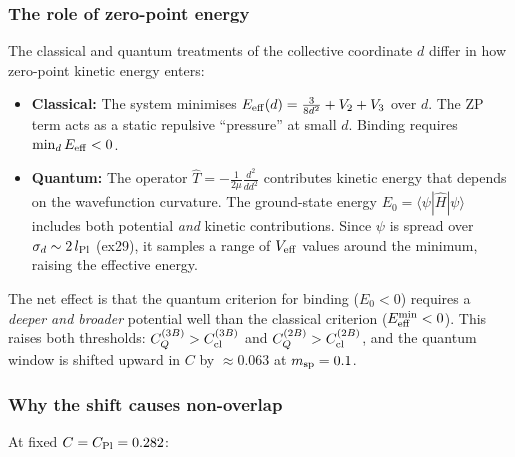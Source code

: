 \subsubsection{The role of zero-point energy}

The classical and quantum treatments of the collective coordinate $d$ differ
in how zero-point kinetic energy enters:

\begin{itemize}
\item \textbf{Classical:} The system minimises $E_{\rm eff}(d)=\frac{3}{8d^2}
  +V_2+V_3$ over $d$.  The ZP term acts as a static repulsive ``pressure''
  at small $d$.  Binding requires $\min_d E_{\rm eff}<0$.

\item \textbf{Quantum:} The operator $\hat{T}=-\frac{1}{2\mu}\frac{d^2}{dd^2}$
  contributes kinetic energy that depends on the wavefunction curvature.
  The ground-state energy $E_0 = \langle\psi|\hat{H}|\psi\rangle$ includes
  both potential \emph{and} kinetic contributions.  Since $\psi$ is spread
  over $\sigma_d\sim 2\,l_{\rm Pl}$ (ex29), it samples a range of $V_{\rm eff}$
  values around the minimum, raising the effective energy.
\end{itemize}

The net effect is that the quantum criterion for binding ($E_0<0$) requires
a \emph{deeper and broader} potential well than the classical criterion
($E_{\rm eff}^{\rm min}<0$).  This raises both thresholds:
$C_Q^{(3B)}>C_{\rm cl}^{(3B)}$ and $C_Q^{(2B)}>C_{\rm cl}^{(2B)}$,
and the quantum window is shifted upward in $C$ by $\approx0.063$ at
$m_{\rm sp}=0.1$.

\subsubsection{Why the shift causes non-overlap}

At fixed $C=C_{\rm Pl}=0.282$:

